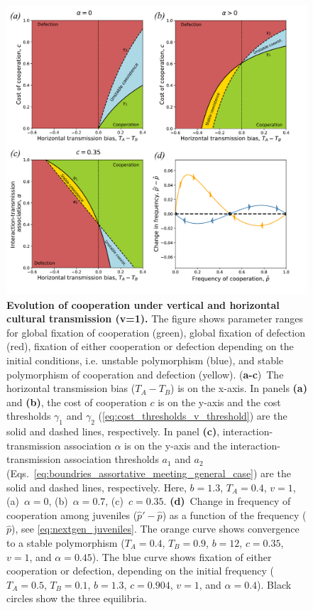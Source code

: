 \documentclass[12pt]{extarticle}
\begin{document}

\begin{figure}[p]
  \centering       
	\includegraphics[width=1\textwidth]{../PRSB_figures/fig_3.pdf}
    \caption{\textbf{Evolution of cooperation under vertical and horizontal cultural transmission (v=1).} 
    The figure shows parameter ranges for global fixation of cooperation (green), global fixation of defection (red), fixation of either cooperation or defection depending on the initial conditions, i.e. unstable polymorphism (blue), and stable polymorphism of cooperation and defection (yellow).
    (\textbf{a-c})~The horizontal transmission bias ($T_A-T_B$) is on the x-axis.
    In panels \textbf{(a)} and \textbf{(b)}, the cost of cooperation $c$ is on the y-axis and the cost thresholds $\gamma_1$ and $\gamma_2$ (\autoref{eq:cost_thresholds_v_threshold}) are the solid and dashed lines, respectively. 
	In panel \textbf{(c)}, interaction-transmission association $\alpha$ is on the y-axis and the interaction-transmission association thresholds $a_1$ and $a_2$ (Eqs.~\ref{eq:boundries_assortative_meeting_general_case}) are the solid and dashed lines, respectively.
    Here, $b=1.3$, $T_A=0.4$, $v=1$, (a)~$\alpha = 0$, (b)~$\alpha = 0.7$, (c)~$c = 0.35$.    
    \textbf{(d)}~Change in frequency of cooperation among juveniles ($\hat{p}'-\hat{p}$) as a function of the frequency ($\hat{p}$), see \autoref{eq:nextgen_juveniles}.
    The orange curve shows convergence to a stable polymorphism ($T_A = 0.4$, $T_B = 0.9$, $b = 12$, $c=0.35$, $v=1$, and $\alpha = 0.45$). %
    The blue curve shows fixation of either cooperation or defection, depending on the initial frequency ($T_A = 0.5$, $T_B = 0.1$, $b = 1.3$, $c=0.904$, $v=1$, and $\alpha = 0.4$).
    Black circles show the three equilibria.
  	}
    \label{fig:equilibria_v1}
\end{figure}
\newpage
\end{document}

